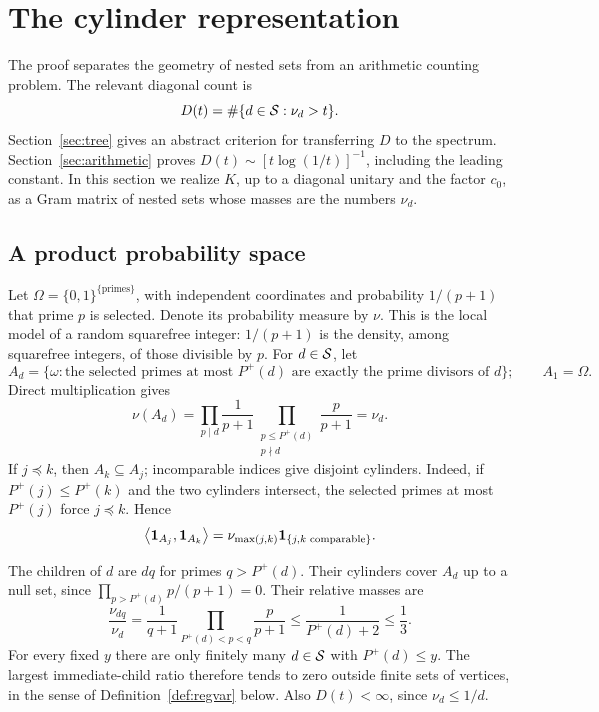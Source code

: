 \section{The cylinder representation}\label{sec:kernel}
The proof separates the geometry of nested sets from an arithmetic counting
problem. The relevant diagonal count is
\begin{equation}\label{eq:Darith}
 D(t)=\#\{d\in\mathcal S:\nu_d>t\}.
\end{equation}
Section~\ref{sec:tree} gives an abstract criterion for transferring $D$ to
the spectrum. Section~\ref{sec:arithmetic} proves
$D(t)\sim[t\log(1/t)]^{-1}$, including the leading constant. In this
section we realize $K$, up to a diagonal unitary and the factor $c_0$, as a
Gram matrix of nested sets whose masses are the numbers $\nu_d$.

\subsection{A product probability space}
Let $\Omega=\{0,1\}^{\{\text{primes}\}}$, with independent coordinates and
probability $1/(p+1)$ that prime $p$ is selected. Denote its probability
measure by $\nu$. This is the local model of a random squarefree integer:
$1/(p+1)$ is the density, among squarefree integers, of those divisible
by $p$. For $d\in\mathcal S$, let
\[
 A_d=\{\omega:\text{the selected primes at most }P^+(d)
                   \text{ are exactly the prime divisors of }d\};
 \qquad A_1=\Omega.
\]
Direct multiplication gives
\begin{equation}\label{eq:cylinder-mass}
 \nu(A_d)=
 \prod_{p\mid d}\frac1{p+1}
 \prod_{\substack{p\le P^+(d)\\p\nmid d}}\frac p{p+1}
 =\nu_d.
\end{equation}
If $j\preceq k$, then $A_k\subseteq A_j$; incomparable indices give disjoint
cylinders. Indeed, if $P^+(j)\le P^+(k)$ and the two cylinders intersect,
the selected primes at most $P^+(j)$ force $j\preceq k$. Hence
\begin{equation}\label{eq:gramentries}
 \left\langle \mathbf 1_{A_j},\mathbf 1_{A_k}\right\rangle
 =\nu_{\max(j,k)}\mathbf 1_{\{j,k\text{ comparable}\}}.
\end{equation}

The children of $d$ are $dq$ for primes $q>P^+(d)$. Their cylinders cover
$A_d$ up to a null set, since
$\prod_{p>P^+(d)}p/(p+1)=0$. Their relative masses are
\begin{equation}\label{eq:arith-ratios}
 \frac{\nu_{dq}}{\nu_d}
 =\frac1{q+1}\prod_{P^+(d)<p<q}\frac p{p+1}
 \le\frac1{P^+(d)+2}\le\frac13.
\end{equation}
For every fixed $y$ there are only finitely many $d\in\mathcal S$ with
$P^+(d)\le y$. The largest immediate-child ratio therefore tends to zero
outside finite sets of vertices, in the sense of
Definition~\ref{def:regvar} below. Also $D(t)<\infty$, since $\nu_d\le1/d$.

